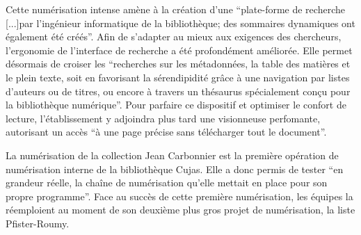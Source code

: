 Cette numérisation intense amène à la création d'une \enquote{plate-forme de recherche [...]par l'ingénieur informatique de la bibliothèque; des sommaires dynamiques ont également été créés}. Afin de s'adapter au mieux aux exigences des chercheurs, l'ergonomie de l'interface de recherche a été profondément améliorée. Elle permet désormais de croiser les \enquote{recherches sur les métadonnées, la table des matières et le plein texte, soit en favorisant la sérendipidité grâce à une navigation par listes d'auteurs ou de titres, ou encore à travers un thésaurus spécialement conçu pour la bibliothèque numérique}. Pour parfaire ce dispositif et optimiser le confort de lecture, l'établissement y adjoindra plus tard une visionneuse perfomante, autorisant un accès \enquote{à une page précise sans télécharger tout le document}.

La numérisation de la collection Jean Carbonnier est la première opération de numérisation interne de la bibliothèque Cujas. Elle a donc permis de tester \enquote{en grandeur réelle, la chaîne de numérisation qu'elle mettait en place pour son propre programme}. Face au succès de cette première numérisation, les équipes la réemploient au moment de son deuxième plus gros projet de numérisation, la liste Pfister-Roumy.